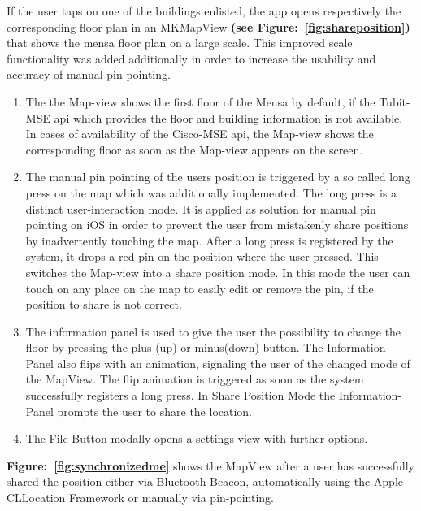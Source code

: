 If the user taps on one of the buildings enlisted, the app opens respectively
the corresponding floor plan in an MKMapView \textbf{(see Figure:~\ref{fig:shareposition})} that shows the mensa floor plan on a large scale. This improved scale functionality was added additionally in order to increase the usability and accuracy of manual pin-pointing.

\begin{enumerate}
\item The the Map-view shows the first floor of the Mensa by default, if the Tubit-MSE api which provides the floor and building information is not available. In cases of availability of the Cisco-MSE api, the Map-view shows the corresponding floor as soon as the Map-view appears on the screen.

\item The manual pin pointing of the users position is triggered by a so called long press on the map which was additionally implemented. The long press is a distinct user-interaction mode. It is applied as solution for manual pin pointing on iOS in order to prevent the user from mistakenly share  positions by inadvertently touching the map. After a long press is registered by the system, it drops a red pin on the position where the user pressed. This switches the Map-view into a share position mode. In this mode the user can touch on any place on the map to easily edit or remove the pin, if the position to share is not correct.

\item The information panel is used to give the user the possibility to change the floor by pressing the plus (up) or minus(down) button. The Information-Panel also flips with an animation, signaling the user of the changed mode of the MapView. The flip animation is triggered as soon as the system successfully registers a long press. In Share Position Mode the Information-Panel prompts the user to share the location.

\item The File-Button modally opens a settings view with further options.
\end{enumerate}


\textbf{Figure:~\ref{fig:synchronizedme}} shows the MapView after a user has successfully shared the position either via Bluetooth Beacon, automatically using the Apple CLLocation Framework or manually via pin-pointing.


